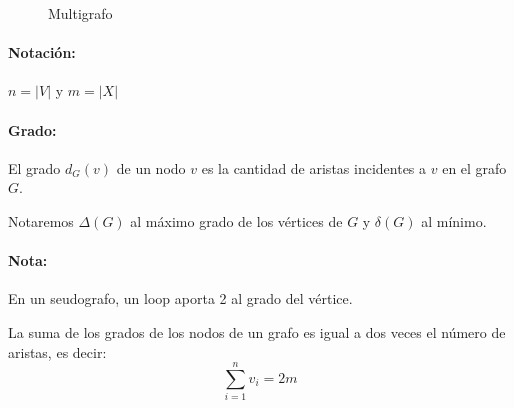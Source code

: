 \begin{figure}[H]
	\begin{center}
	\end{center}		
	\caption{Multigrafo}
\end{figure}

\paragraph{Notación:} \(n = |V|\) y \(m=|X|\)

\paragraph{Grado:} El grado \(d_G(v)\) de un nodo \(v\) es la cantidad de aristas incidentes a \(v\) en el grafo \(G\). 

Notaremos \(\Delta(G)\) al máximo grado de los vértices de \(G\) y \(\delta(G)\) al mínimo.

\paragraph{Nota:} En un seudografo, un loop aporta 2 al grado del vértice.

\begin{theorem}
La suma de los grados de los nodos de un grafo es igual a dos veces el número de aristas, es decir: \[\sum_{i=1}^{n}v_i = 2m\]
\end{theorem}

